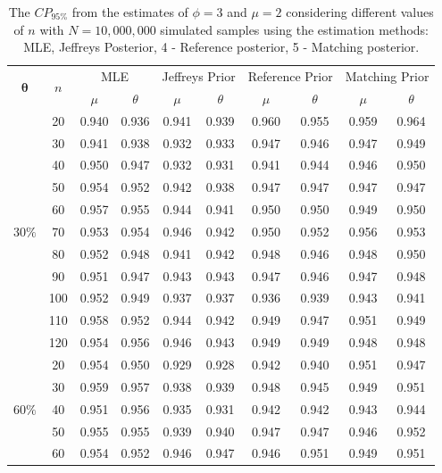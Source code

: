 \begin{table}[!h]
\centering
\caption{The $CP_{95\%}$ from the estimates of $\phi=3$ and $\mu=2$ considering different values of $n$  with $N=10,000,000$ simulated samples using the estimation methods:  MLE,  Jeffreys Posterior, 4 - Reference posterior, 5 - Matching posterior.}
\begin{tabular}{c|c|c|c|c|c|c|c|c|c}
\hline
\multirow{2}{*}{$\boldsymbol{\theta}$ }  & \multirow{2}{*}{$n$ }  & \multicolumn{2}{c|}{MLE} & \multicolumn{2}{c|}{Jeffreys Prior} & \multicolumn{2}{c|}{Reference Prior}  & \multicolumn{2}{c}{Matching Prior} \\  &  &    $\mu$ & $\theta$ & $\mu$ & $\theta$ & $\mu$ & $\theta$  & $\mu$ & $\theta$ \\
\hline
\multirow{11}{*}{$30\%$} 
&  20 & 0.940 & 0.936 & 0.941 & 0.939 & 0.960 & 0.955 & 0.959 & 0.964 \\
&  30 & 0.941 & 0.938 & 0.932 & 0.933 & 0.947 & 0.946 & 0.947 & 0.949 \\
&  40 & 0.950 & 0.947 & 0.932 & 0.931 & 0.941 & 0.944 & 0.946 & 0.950 \\
&  50 & 0.954 & 0.952 & 0.942 & 0.938 & 0.947 & 0.947 & 0.947 & 0.947 \\
&  60 & 0.957 & 0.955 & 0.944 & 0.941 & 0.950 & 0.950 & 0.949 & 0.950 \\
&  70 & 0.953 & 0.954 & 0.946 & 0.942 & 0.950 & 0.952 & 0.956 & 0.953 \\
&  80 & 0.952 & 0.948 & 0.941 & 0.942 & 0.948 & 0.946 & 0.948 & 0.950 \\
&  90 & 0.951 & 0.947 & 0.943 & 0.943 & 0.947 & 0.946 & 0.947 & 0.948 \\
&  100 & 0.952 & 0.949 & 0.937 & 0.937 & 0.936 & 0.939 & 0.943 & 0.941 \\
&  110 & 0.958 & 0.952 & 0.944 & 0.942 & 0.949 & 0.947 & 0.951 & 0.949 \\
&  120 & 0.954 & 0.956 & 0.946 & 0.943 & 0.949 & 0.949 & 0.948 & 0.948 \\ \hline
\multirow{11}{*}{$60\%$}
&  20 & 0.954 & 0.950 & 0.929 & 0.928 & 0.942 & 0.940 & 0.951 & 0.947 \\
&  30 & 0.959 & 0.957 & 0.938 & 0.939 & 0.948 & 0.945 & 0.949 & 0.951 \\
&  40 & 0.951 & 0.956 & 0.935 & 0.931 & 0.942 & 0.942 & 0.943 & 0.944 \\
&  50 & 0.955 & 0.955 & 0.939 & 0.940 & 0.947 & 0.947 & 0.946 & 0.952 \\
&  60 & 0.954 & 0.952 & 0.946 & 0.947 & 0.946 & 0.951 & 0.949 & 0.951 \\

\end{tabular}
\end{table}
